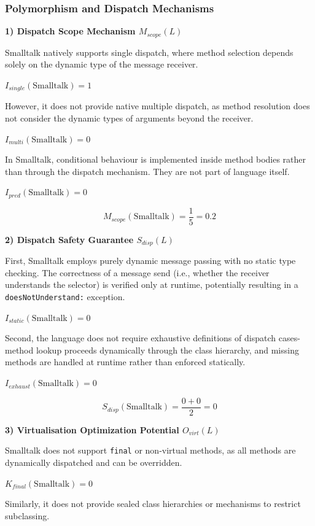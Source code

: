\subsubsection{Polymorphism and Dispatch Mechanisms}

\textbf{1) Dispatch Scope Mechanism $M_{scope}(L)$}

Smalltalk natively supports single dispatch, where method selection depends solely on the dynamic type of the message receiver.

$I_{single}(\text{Smalltalk})=1$

However, it does not provide native multiple dispatch, as method resolution does not consider the dynamic types of arguments beyond the receiver.

$I_{multi}(\text{Smalltalk})=0$

In Smalltalk, conditional behaviour is implemented inside method bodies rather than through the dispatch mechanism. They are not part of language itself.

$I_{pred}(\text{Smalltalk})=0$ 

\[
    M_{scope}(\text{Smalltalk})=\frac{1}{5}=0.2
\]

\textbf{2) Dispatch Safety Guarantee $S_{disp}(L)$}

First, Smalltalk employs purely dynamic message passing with no static type checking. The correctness of a message send (i.e., whether the receiver understands the selector) is verified only at runtime, potentially resulting in a \texttt{doesNotUnderstand:} exception.

$I_{static}(\text{Smalltalk})=0$

Second, the language does not require exhaustive definitions of dispatch cases-method lookup proceeds dynamically through the class hierarchy, and missing methods are handled at runtime rather than enforced statically.

$I_{exhaust}(\text{Smalltalk})=0$

\[
    S_{disp}(\text{Smalltalk})=\frac{0+0}{2}=0
\]

\textbf{3) Virtualisation Optimization Potential $O_{virt}(L)$}

Smalltalk does not support \texttt{final} or non-virtual methods, as all methods are dynamically dispatched and can be overridden.

$K_{final}(\text{Smalltalk})=0$

Similarly, it does not provide sealed class hierarchies or mechanisms to restrict subclassing.


